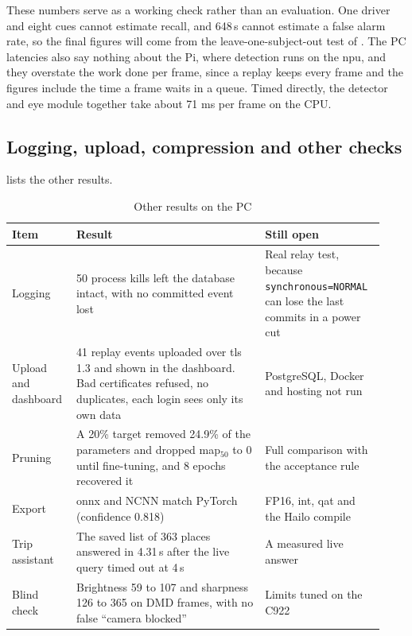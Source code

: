 These numbers serve as a working check rather than an evaluation. One driver and eight cues cannot estimate recall, and 648\,s cannot estimate a false alarm rate, so the final figures will come from the leave-one-subject-out test of . The PC latencies also say nothing about the Pi, where detection runs on the \gls{npu}, and they overstate the work done per frame, since a replay keeps every frame and the figures include the time a frame waits in a queue. Timed directly, the detector and eye module together take about 71 ms per frame on the CPU.

\subsection{Logging, upload, compression and other checks}

 lists the other results.

\begin{table}[htbp]
\centering
\caption{Other results on the PC}
\label{tab:other-results}
\footnotesize
\setlength{\tabcolsep}{3pt}
\renewcommand{\arraystretch}{1.15}
\begin{tabular}{|p{0.150\linewidth}|p{0.480\linewidth}|p{0.300\linewidth}|}
\hline
\textbf{Item} & \textbf{Result} & \textbf{Still open} \\
\hline
Logging & 50 process kills left the database intact, with no committed event lost & Real relay test, because \texttt{synchronous=NORMAL} can lose the last commits in a power cut \\
\hline
Upload and dashboard & 41 replay events uploaded over \gls{tls} 1.3 and shown in the dashboard. Bad certificates refused, no duplicates, each login sees only its own data & PostgreSQL, Docker and hosting not run \\
\hline
Pruning & A 20\% target removed 24.9\% of the parameters and dropped \gls{map}$_{50}$ to 0 until fine-tuning, and 8 epochs recovered it & Full comparison with the acceptance rule \\
\hline
Export & \gls{onnx} and NCNN match PyTorch (confidence 0.818) & FP16, \gls{int}, \gls{qat} and the Hailo compile \\
\hline
Trip assistant & The saved list of 363 places answered in 4.31\,s after the live query timed out at 4\,s & A measured live answer \\
\hline
Blind check & Brightness 59 to 107 and sharpness 126 to 365 on DMD frames, with no false ``camera blocked'' & Limits tuned on the C922 \\
\hline
\end{tabular}
\end{table}

